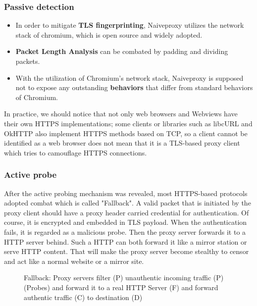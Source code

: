 \documentclass[conference]{IEEEtran}
\begin{document}
\subsubsection{Passive detection}
\begin{itemize}
    \item In order to mitigate \textbf{TLS fingerprinting}, Naiveproxy utilizes the network stack of chromium, which is open source and widely adopted. 
    \item \textbf{Packet Length Analysis} can be combated by padding and dividing packets.
    \item  With the utilization of Chromium's network stack, Naiveproxy is supposed not to expose any outstanding \textbf{behaviors} that differ from standard behaviors of Chromium.
\end{itemize}

In practice, we should notice that not only web browsers and Webviews have their own HTTPS implementations; some clients or libraries such as libcURL and OkHTTP also implement HTTPS methods based on TCP, so a client cannot be identified as a web browser does not mean that it is a TLS-based proxy client which tries to camouflage HTTPS connections.


\subsubsection{Active probe}\label{sec:apc}
After the active probing mechanism was revealed, most HTTPS-based protocols adopted combat which is called "Fallback". A valid packet that is initiated by the proxy client should have a proxy header carried credential for authentication. Of course, it is encrypted and embedded in TLS payload. When the authentication fails, it is regarded as a malicious probe. Then the proxy server forwards it to a HTTP server behind. Such a HTTP can both forward it like a mirror station or serve  HTTP content. That will make the proxy server become stealthy to censor and act like a normal website or a mirror site.

\begin{figure}[!h]
    \centering
    
    \caption{Fallback: Proxy servers filter (P) unauthentic incoming traffic (P) (Probes) and forward it to a real HTTP Server (F) and forward authentic traffic (C) to destination (D)}
    \label{fig:fallback}
\end{figure}
\end{document}
